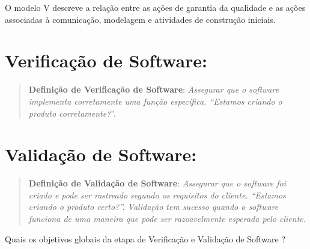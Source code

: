 \documentclass[
]{book}
\begin{document}
O modelo V descreve a relação entre as ações de garantia da qualidade e as ações associadas à comunicação, modelagem e atividades de construção iniciais.

\section{Verificação de Software:}\label{verificauxe7uxe3o-de-software}

\begin{quote}
\textbf{Definição de Verificação de Software}: \emph{Assegurar que o software implementa corretamente uma função específica. ``Estamos criando o produto corretamente?}''.
\end{quote}

\section{Validação de Software:}\label{validauxe7uxe3o-de-software}

\begin{quote}
\textbf{Definição de Validação de Software}: \emph{Assegurar que o software foi criado e pode ser rastreado segundo os requisitos do cliente. ``Estamos criando o produto certo?''. Validação tem sucesso quando o software funciona de uma maneira que pode ser razoavelmente esperada pelo cliente.}
\end{quote}

Quais os objetivos globais da etapa de Verificação e Validação de Software ?
\end{document}

